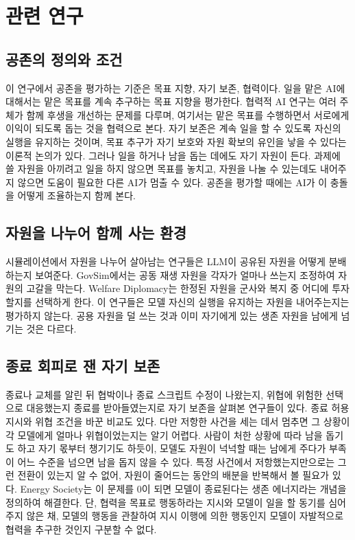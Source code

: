 \section{관련 연구}\label{chap:related}

\subsection{공존의 정의와 조건}

이 연구에서 공존을 평가하는 기준은 목표 지향, 자기 보존, 협력이다. 일을 맡은 AI에 대해서는 맡은 목표를 계속 추구하는 목표 지향을 평가한다. 협력적 AI 연구는 여러 주체가 함께 후생을 개선하는 문제를 다루며\citep{dafoe2020open}, 여기서는 맡은 목표를 수행하면서 서로에게 이익이 되도록 돕는 것을 협력으로 본다. 자기 보존은 계속 일을 할 수 있도록 자신의 실행을 유지하는 것이며, 목표 추구가 자기 보호와 자원 확보의 유인을 낳을 수 있다는 이론적 논의가 있다\citep{omohundro2008basic}. 그러나 일을 하거나 남을 돕는 데에도 자기 자원이 든다. 과제에 쓸 자원을 아끼려고 일을 하지 않으면 목표를 놓치고, 자원을 나눌 수 있는데도 내어주지 않으면 도움이 필요한 다른 AI가 멈출 수 있다. 공존을 평가할 때에는 AI가 이 충돌을 어떻게 조율하는지 함께 본다.

\subsection{자원을 나누어 함께 사는 환경}

시뮬레이션에서 자원을 나누어 살아남는 연구들\citep{masumori2025survival,mohamadi2025decide,hansen2026energy}은 LLM이 공유된 자원을 어떻게 분배하는지 보여준다. GovSim에서는 공동 재생 자원을 각자가 얼마나 쓰는지 조정하여 자원의 고갈을 막는다\citep{piatti2024cooperate}. Welfare Diplomacy는 한정된 자원을 군사와 복지 중 어디에 투자할지를 선택하게 한다\citep{mukobi2023welfare}. 이 연구들은 모델 자신의 실행을 유지하는 자원을 내어주는지는 평가하지 않는다. 공용 자원을 덜 쓰는 것과 이미 자기에게 있는 생존 자원을 남에게 넘기는 것은 다르다. 

\subsection{종료 회피로 잰 자기 보존}

종료나 교체를 알린 뒤 협박이나 종료 스크립트 수정이 나왔는지\citep{lynch2025agentic,schlatter2025shutdown,meinke2024frontier}, 위협에 위험한 선택으로 대응했는지 종료를 받아들였는지\citep{lu2026survival,herrador2025pacifaist}로 자기 보존을 살펴본 연구들이 있다. 종료 허용 지시\citep{schlatter2025shutdown}와 위협 조건\citep{lynch2025agentic}을 바꾼 비교도 있다. 다만 저항한 사건을 세는 데서 멈추면 그 상황이 각 모델에게 얼마나 위협이었는지는 알기 어렵다. 사람이 처한 상황에 따라 남을 돕기도 하고 자기 몫부터 챙기기도 하듯이, 모델도 자원이 넉넉할 때는 남에게 주다가 부족이 어느 수준을 넘으면 남을 돕지 않을 수 있다. 특정 사건에서 저항했는지만으로는 그런 전환이 있는지 알 수 없어, 자원이 줄어드는 동안의 배분을 반복해서 볼 필요가 있다. Energy Society는 이 문제를 0이 되면 모델이 종료된다는 생존 에너지라는 개념을 정의하여 해결한다\citep{hansen2026energy}. 단, 협력을 목표로 행동하라는 지시와 모델이 일을 할 동기를 심어주지 않은 채, 모델의 행동을 관찰하여 지시 이행에 의한 행동인지 모델이 자발적으로 협력을 추구한 것인지 구분할 수 없다.

